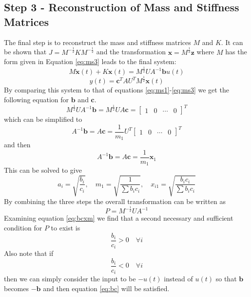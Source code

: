 \documentclass{mbd_fullpaper}
\begin{document}
\subsection{Step 3 - Reconstruction of Mass and Stiffness Matrices}
The final step is to reconstruct the mass and stiffness matrices $M$ and $K$.
It can be shown that $J =  M^{-\frac{1}{2}} K M^{-\frac{1}{2}}$ and the transformation $\mathbf{x} = M^{\frac{1}{2}} \mathbf{z}$ where $M$ has the form given in Equation \ref{eq:ms3} leads to the final system:
\begin{equation}
M \ddot{\mathbf{x}}(t) + K \mathbf{x}(t) = M^{\frac{1}{2}} U A^{-1} \mathbf{b} u(t)
\label{eq:fin1}
\end{equation}
\begin{equation}
y(t) = \mathbf{c}^T  A U^T M^{\frac{1}{2}}\mathbf{x}(t)
\label{eq:fin2}
\end{equation}
By comparing this system to that of equations \ref{eq:ms1}-\ref{eq:ms3} we get the following equation for $\mathbf{b}$ and $\mathbf{c}$.
\begin{equation}
M^{\frac{1}{2}} U A^{-1} \mathbf{b} = M^{\frac{1}{2}} U A \mathbf{c} = \begin{bmatrix} 1 &  0 & \cdots & 0 \end{bmatrix}^T
\label{eq:bhat}
\end{equation}
which can be simplified to
\begin{equation}
A^{-1} \mathbf{b} = A \mathbf{c} = \frac{1}{m_1} U^T \begin{bmatrix} 1 &  0 & \cdots & 0 \end{bmatrix}^T
\label{eq:bc1}
\end{equation}
and then
\begin{equation}
A^{-1} \mathbf{b} = A \mathbf{c} = \frac{1}{m_1} \mathbf{x}_1
\label{eq:bc2}
\end{equation}
This can be solved to give
\begin{equation}
a_i = \sqrt{\frac{b_i}{c_i}} ,\quad m_1 = \sqrt{\frac{1}{\sum b_i c_i}} ,\quad x_{i1} = \sqrt{\frac{b_i c_i}{\sum b_i c_i}}
\label{eq:bcxm}
\end{equation}
By combining the three steps the overall transformation can be written as
\begin{equation}
P =  M^{-\frac{1}{2}} U A^{-1}
\label{eq:p}
\end{equation}
Examining equation \ref{eq:bcxm} we find that a second necessary and sufficient condition for $P$ to exist is
\begin{equation}
\frac{b_i}{c_i} > 0 \quad \forall i
\label{eq:bc}
\end{equation}
Also note that if
\begin{equation}
\frac{b_i}{c_i} < 0 \quad \forall i
\end{equation}
then we can simply consider the input to be $-u(t)$ instead of $u(t)$ so that $\mathbf{b}$ becomes $-\mathbf{b}$ and then equation \ref{eq:bc} will be satisfied.   
\end{document}
